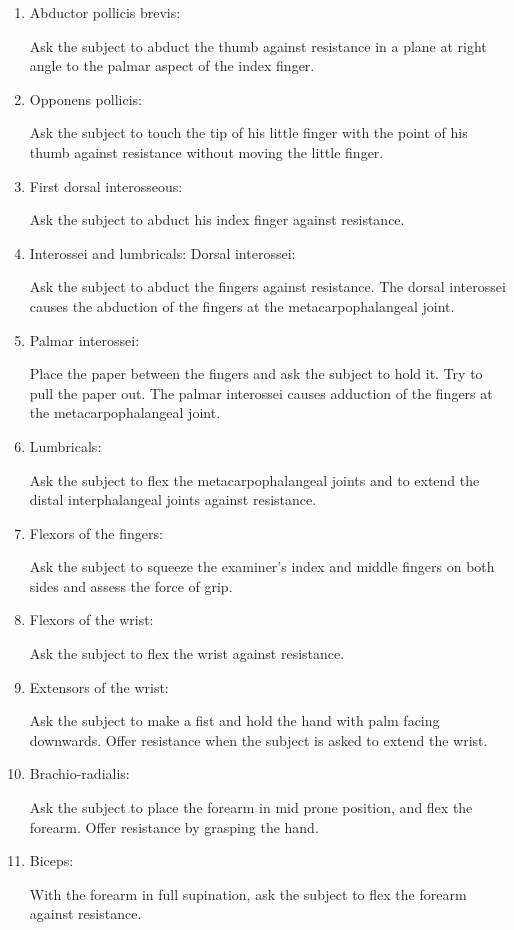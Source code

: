 \documentclass[a4paper,12pt,openany,twoside]{book}
\begin{document}
	\begin{enumerate}
\item{ Abductor pollicis brevis:
	\par
	Ask the subject to abduct the thumb against resistance in a plane at right angle to the palmar aspect of the index finger.
}
\item{ Opponens pollicis:
	\par
	Ask the subject to touch the tip of his little finger with the point of his thumb against resistance without moving the little finger.
}
\item{ First dorsal interosseous:
	\par
	Ask the subject to abduct his index finger against resistance.
}
\item{ Interossei and lumbricals: Dorsal interossei:
	\par
	Ask the subject to abduct the fingers against resistance. The dorsal interossei causes the abduction of the fingers at the metacarpophalangeal joint.
}
\item{	Palmar interossei:
	\par
	Place the paper between the fingers and ask the subject to hold it. Try to pull the paper out. The palmar interossei causes adduction of the fingers at the metacarpophalangeal joint.
			}
\item{Lumbricals:
	\par
	Ask the subject to flex the metacarpophalangeal joints and to extend the distal interphalangeal joints against resistance.
}
\item{ Flexors of the fingers: 
\par
Ask the subject to squeeze the examiner's index and middle fingers on both sides and assess the force of grip.
}
\item{ Flexors of the wrist: 
\par
Ask the subject to flex the wrist against resistance.
}
\item{ Extensors of the wrist: 
\par
Ask the subject to make a fist and hold the hand with palm facing downwards. Offer resistance when the subject is asked to extend the wrist.
}
\item{ Brachio-radialis: 
\par
Ask the subject to place the forearm in mid prone position, and flex the forearm. Offer resistance by grasping the hand.
}
\item{ Biceps: 
\par
With the forearm in full supination, ask the subject to flex the forearm against resistance.
}
\end{enumerate}
\end{document}
